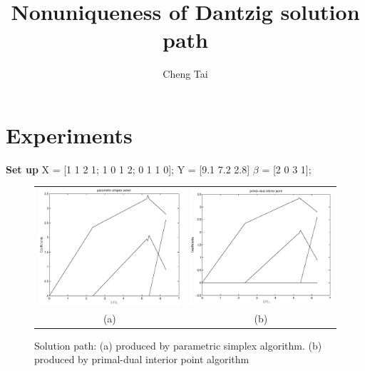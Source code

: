\documentclass[]{article}
\begin{document}
\title{Nonuniqueness of Dantzig solution path}
\author{Cheng Tai}
\date{}
\maketitle

\section{Experiments}
\textbf{Set up}
X = [1 1 2 1; 1 0 1 2; 0 1 1 0];
Y = [9.1 7.2 2.8]
$\beta$ = [2 0 3 1];

\begin{figure}[htp!]\centering 
\begin{tabular}{cc}
\includegraphics[width=0.5 \textwidth]{ps1.eps}& 
\includegraphics[width=0.5 \textwidth]{pd1.eps}\\
(a) & (b)\\
\end{tabular}
\caption{Solution path: (a) produced by parametric simplex algorithm. (b) produced by primal-dual interior point algorithm}
\end{figure}
\end{document}
